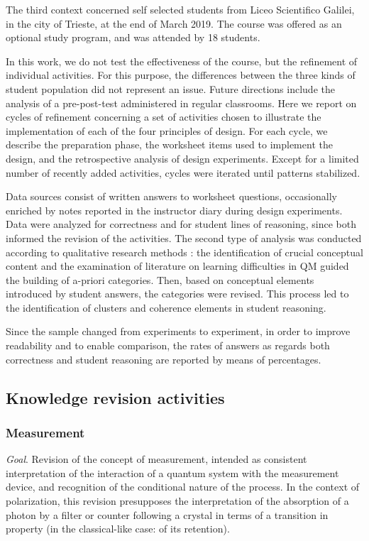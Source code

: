 \documentclass[twocolumn,secnumarabic,amssymb, nobibnotes, aps, prd, nofootinbib]{revtex4-2}
\begin{document}
The third context concerned self selected students from Liceo Scientifico Galilei, in the city of Trieste, at the end of March 2019. The course was offered as an optional study program, and was attended by 18 students.

In this work, we do not test the effectiveness of the course, but the refinement of individual activities. For this purpose, the differences between the three kinds of student population did not represent an issue. Future directions include the analysis of a pre-post-test administered in regular classrooms. Here we report on cycles of refinement concerning a set of activities chosen to illustrate the implementation of each of the four principles of design. For each cycle, we describe the preparation phase, the worksheet items used to implement the design, and the retrospective analysis of design experiments. Except for a limited number of recently added activities, cycles were iterated until patterns stabilized.

Data sources consist of written answers to worksheet questions, occasionally enriched by notes reported in the instructor diary during design experiments. Data were analyzed for correctness and for student lines of reasoning, since both informed the revision of the activities. The second type of analysis was conducted according to qualitative research methods \cite{Erickson2012}: the identification of crucial conceptual content and the examination of literature on learning difficulties in QM guided the building of a-priori categories. Then, based on conceptual elements introduced by student answers, the categories were revised. This process led to the identification of clusters and coherence elements in student reasoning.

Since the sample changed from experiments to experiment, in order to improve readability and to enable comparison, the rates of answers as regards both correctness and student reasoning are reported by means of percentages.

\subsection{Knowledge revision activities}  \label{Sec:5.2}

\subsubsection{Measurement} \label{Sec:5.2.1}

\emph{Goal}. Revision of the concept of measurement, intended as consistent interpretation of the interaction of a quantum system with the measurement device, and recognition of the conditional nature of the process. In the context of polarization, this revision presupposes the interpretation of the absorption of a photon by a filter or counter following a crystal in terms of a transition in property (in the classical-like case: of its retention).
\end{document}
